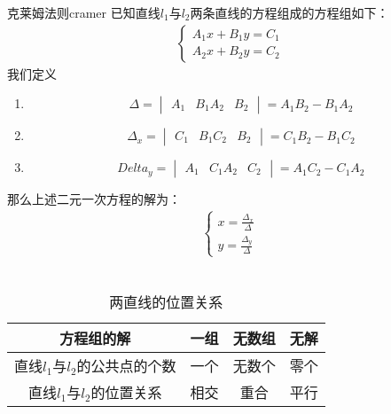 \begin{theorem}{克莱姆法则}{cramer}
    已知直线$l_1$与$l_2$两条直线的方程组成的方程组如下：
    \begin{eqnarray}
        \left \{
        \begin{array}{l}
            A_1 x + B_1 y = C_1\\
            A_2 x + B_2 y = C_2
        \end{array}	
        \right .
    \end{eqnarray}
    我们定义
    \begin{enumerate}
        \item  \begin{equation*}
            \Delta =
            \begin{vmatrix}
                A_1&B_1
                A_2&B_2
            \end{vmatrix}
            = A_{1}B_{2}-B_{1}A_{2}
        \end{equation*}
        \item \begin{equation*}
           \Delta_{x}=
           \begin{vmatrix}
               C_1&B_1
               C_2&B_2
           \end{vmatrix}
            = C_{1}B_{2}-B_{1}C_{2}
        \end{equation*}
        \item \begin{equation*}
           Delta_{y}=
           \begin{vmatrix}
               A_1&C_1
               A_2&C_2
           \end{vmatrix}
            = A_{1}C_{2}-C_{1}A_{2}
        \end{equation*}
    \end{enumerate}
    那么上述二元一次方程的解为：
        \begin{eqnarray}
            \left \{
            \begin{array}{l}
                \displaystyle x = \frac{\Delta_{x}}{\Delta}\\
                \displaystyle y = \frac{\Delta_{y}}{\Delta}
            \end{array}	
            \right .
        \end{eqnarray}\\
\end{theorem}


\begin{table}[htbp]
  \caption{两直线的位置关系\label{tab:color thm}}
  \centering
  \begin{tabular}{cccc}
  \toprule
              方程组的解
              & 一组
              & 无数组
              & 无解\\
  \midrule
              直线$l_1$与$l_2$的公共点的个数
              & 一个
              & 无数个
              & 零个 \\
              直线$l_1$与$l_2$的位置关系
              & 相交
              & 重合
              & 平行 \\
  \bottomrule
  \end{tabular}
\end{table}


